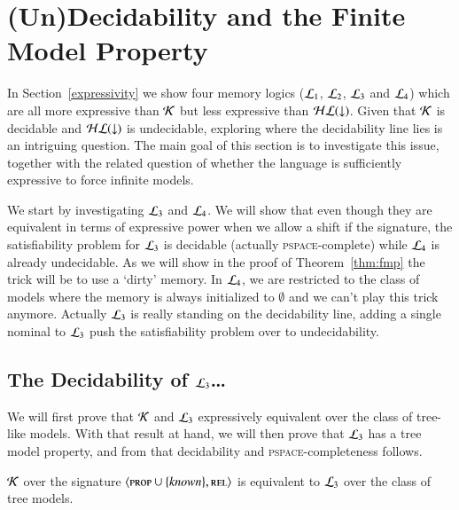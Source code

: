\section{(Un)Decidability and the Finite Model Property}

In Section~\ref{expressivity} we show four memory logics ($\mathcal{L}_1$,
$\mathcal{L}_2$, $\mathcal{L}_3$ and $\mathcal{L}_4$) which are all more expressive
than $\mathcal{K}$ but less expressive than $\mathcal{HL}({\downarrow})$. Given that $\mathcal{K}$ is
decidable and $\mathcal{HL}({\downarrow})$ is undecidable, exploring where the
decidability line lies is an intriguing question.  The main goal of
this section is to investigate this issue, together with the related
question of whether the language is sufficiently expressive to force
infinite models.

We start by investigating $\mathcal{L}_3$ and $\mathcal{L}_4$. We will show
that even though they are equivalent in terms of expressive power
when we allow a shift if the signature, the satisfiability problem
for $\mathcal{L}_3$ is decidable (actually \textsc{pspace}-complete) while
$\mathcal{L}_4$ is already undecidable. As we will show in the proof of
Theorem~\ref{thm:fmp} the trick will be to use a `dirty' memory. In
$\mathcal{L}_4$, we are restricted to the class of models where the
memory is always initialized to $\emptyset$ and we can't play this
trick anymore.  Actually $\mathcal{L}_3$ is really standing on the
decidability line, adding a single nominal to $\mathcal{L}_3$ push the
satisfiability problem over to undecidability.

\subsection{The Decidability of $\mathcal{L}_3$\ldots}

We will first prove that $\mathcal{K}$ and $\mathcal{L}_3$ expressively
equivalent over the class of tree-like models.  With that result
at hand, we will then prove that $\mathcal{L}_3$ has a tree model
property, and from that decidability and \textsc{pspace}-completeness
follows.

\begin{thm}\label{prop:sat-preserv-tree}
$\mathcal{K}$  over the signature $\langle \textsc{prop} \cup \{\mathit{known}\},\textsc{rel} \rangle$
is equivalent to $\mathcal{L}_3$ over the class of tree models.
\end{thm}


